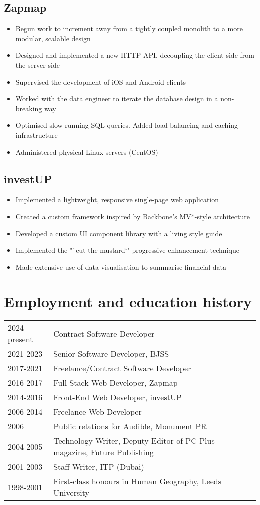 \documentclass[a4paper,10pt]{article}
\begin{document}
\subsection*{Zapmap \hfill {}}
\begin{itemize}
  \item Begun work to increment away from a tightly coupled monolith to a more modular, scalable design
  \item Designed and implemented a new HTTP API, decoupling the client-side from the server-side
  \item Supervised the development of iOS and Android clients
  \item Worked with the data engineer to iterate the database design in a non-breaking way
  \item Optimised slow-running SQL queries. Added load balancing and caching infrastructure
  \item Administered physical Linux servers (CentOS)
\end{itemize}

\subsection*{investUP \hfill {}}
\begin{itemize}
  \item Implemented a lightweight, responsive single-page web application
  \item Created a custom framework inspired by Backbone's MV*-style architecture
  \item Developed a custom UI component library with a living style guide
  \item Implemented the "`cut the mustard`" progressive enhancement technique
  \item Made extensive use of data visualisation to summarise financial data
\end{itemize}

\section*{Employment and education history}

\begin{tabular}{l l}
  2024-present & Contract Software Developer \\
  2021-2023 & Senior Software Developer, BJSS \\
  2017-2021 & Freelance/Contract Software Developer \\
  2016-2017 & Full-Stack Web Developer, Zapmap \\
  2014-2016 & Front-End Web Developer, investUP \\
  2006-2014 & Freelance Web Developer \\
  2006 & Public relations for Audible, Monument PR \\
  2004-2005 & Technology Writer, Deputy Editor of PC Plus magazine, Future Publishing \\
  2001-2003 & Staff Writer, ITP (Dubai) \\
  1998-2001 & First-class honours in Human Geography, Leeds University
 \end{tabular}
\end{document}
